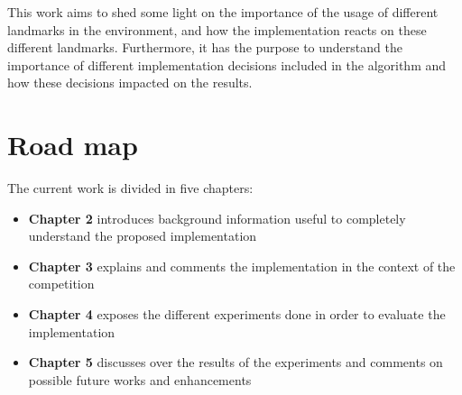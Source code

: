 This work aims to shed some light on the importance of the usage of different landmarks in the environment, and how the implementation reacts on these different landmarks. Furthermore, it has the purpose to understand the importance of different implementation decisions included in the algorithm and how these decisions impacted on the results.
\section*{Road map}
The current work is divided in five chapters:
\begin{itemize}
    \item{\textbf{Chapter 2} introduces background information useful to completely understand the proposed implementation}
    \item{\textbf{Chapter 3} explains and comments the implementation in the context of the competition}
    \item{\textbf{Chapter 4} exposes the different experiments done in order to evaluate the implementation}
    \item{\textbf{Chapter 5} discusses over the results of the experiments and comments on possible future works and enhancements}
\end{itemize}
